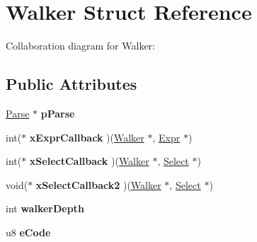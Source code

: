 \hypertarget{structWalker}{}\section{Walker Struct Reference}
\label{structWalker}


Collaboration diagram for Walker\+:
\subsection*{Public Attributes}
\begin{DoxyCompactItemize}
\item 
\hyperlink{structParse}{Parse} $\ast$ {\bfseries p\+Parse}\hypertarget{structWalker_ac6e8e756b5da8f187b9cf6b94560f352}{}\label{structWalker_ac6e8e756b5da8f187b9cf6b94560f352}

\item 
int($\ast$ {\bfseries x\+Expr\+Callback} )(\hyperlink{structWalker}{Walker} $\ast$, \hyperlink{structExpr}{Expr} $\ast$)\hypertarget{structWalker_a46cbdf0ccdcf736096a2f168218d28fe}{}\label{structWalker_a46cbdf0ccdcf736096a2f168218d28fe}

\item 
int($\ast$ {\bfseries x\+Select\+Callback} )(\hyperlink{structWalker}{Walker} $\ast$, \hyperlink{structSelect}{Select} $\ast$)\hypertarget{structWalker_a76a2f8850bf1db17955fe85d65831cb0}{}\label{structWalker_a76a2f8850bf1db17955fe85d65831cb0}

\item 
void($\ast$ {\bfseries x\+Select\+Callback2} )(\hyperlink{structWalker}{Walker} $\ast$, \hyperlink{structSelect}{Select} $\ast$)\hypertarget{structWalker_ad35c57031847321ab3db9b7c0946b5e7}{}\label{structWalker_ad35c57031847321ab3db9b7c0946b5e7}

\item 
int {\bfseries walker\+Depth}\hypertarget{structWalker_a1183df46d2b0ecac73e76336067cf207}{}\label{structWalker_a1183df46d2b0ecac73e76336067cf207}

\item 
u8 {\bfseries e\+Code}\hypertarget{structWalker_a462e077f572efcae6a708f0640561807}{}\label{structWalker_a462e077f572efcae6a708f0640561807}


\end{DoxyCompactItemize}
